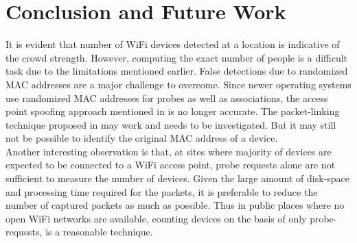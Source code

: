 \section{Conclusion and Future Work}

It is evident that number of WiFi devices detected at a location is indicative of the crowd strength. However, computing the exact number of people is a difficult task due to the limitations mentioned earlier. False detections due to randomized MAC addresses are a major challenge to overcome. Since newer operating systems use randomized MAC addresses for probes as well as associations, the access point spoofing approach mentioned in \textcite{brower_mac-based_nodate} is no longer accurate. The packet-linking technique proposed in \textcite{freudiger_how_2015} may work and needs to be investigated. But it may still not be possible to identify the original MAC address of a device.\\
Another interesting observation is that, at sites where majority of devices are expected to be connected to a WiFi access point, probe requests alone are not sufficient to measure the number of devices. Given the large amount of disk-space and processing time required for the packets, it is preferable to reduce the number of captured packets as much as possible. Thus in public places where no open WiFi networks are available, counting devices on the basis of only probe-requests, is a reasonable technique.